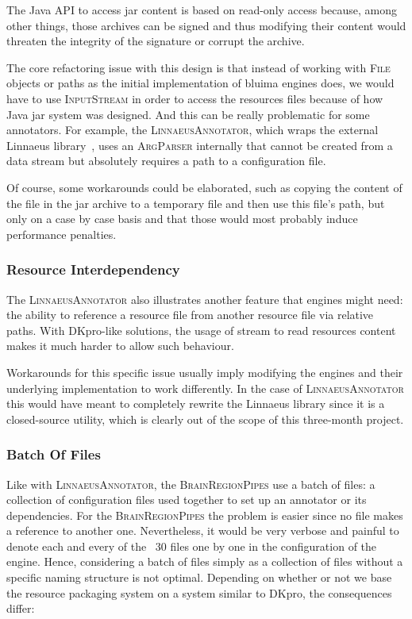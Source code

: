 \documentclass{article}
\newcommand{\ID}[1]{{\textsc{#1}}}
\begin{document}
The Java API to access jar content is based on read-only access because, among other things, those
archives can be signed and thus modifying their content would threaten the integrity of the
signature or corrupt the archive.

The core refactoring issue with this design is that instead of working with \ID{File} objects or
paths as the initial implementation of bluima engines does, we would have to use \ID{InputStream} in
order to access the resources files because of how Java jar system was designed. And this can be
really problematic for some annotators. For example, the \ID{LinnaeusAnnotator}, which wraps the
external Linnaeus library~\cite{linnaeus}, uses an \ID{ArgParser} internally that cannot be created
from a data stream but absolutely requires a path to a configuration file.

Of course, some workarounds could be elaborated, such as copying the content of the file in the jar
archive to a temporary file and then use this file's path, but only on a case by case basis and that
those would most probably induce performance penalties.

\subsubsection{Resource Interdependency}

The \ID{LinnaeusAnnotator} also illustrates another feature that engines might need: the ability to
reference a resource file from another resource file via relative paths. With DKpro-like solutions,
the usage of stream to read resources content makes it much harder to allow such behaviour.

Workarounds for this specific issue usually imply modifying the engines and their underlying
implementation to work differently. In the case of \ID{Linnaeus\-Annotator} this would have meant to
completely rewrite the Linnaeus library since it is a closed-source utility, which is clearly out of
the scope of this three-month project.

\subsubsection{Batch Of Files}

Like with \ID{LinnaeusAnnotator}, the \ID{BrainRegionPipes} use a batch of files: a collection of
configuration files used together to set up an annotator or its dependencies. For the
\ID{BrainRegionPipes} the problem is easier since no file makes a reference to another one.
Nevertheless, it would be very verbose and painful to denote each and every of the ~30 files one by
one in the configuration of the engine. Hence, considering a batch of files simply as a collection
of files without a specific naming structure is not optimal. Depending on whether or not we base the
resource packaging system on a system similar to DKpro, the consequences differ:
\end{document}
